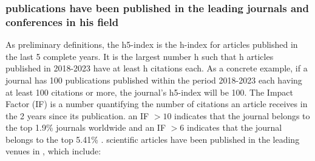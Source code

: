 \documentclass[11pt]{article}
\begin{document}
\subsubsection{\drs publications have been published in the leading journals and conferences in his field}

As preliminary definitions, the h5-index is the h-index for articles published in the last 5 complete years. It is the largest number h such that h articles published in 2018-2023 have at least h citations each. As a concrete example, if a journal has 100 publications published within the period 2018-2023 each having at least 100 citations or more, the journal's h5-index will be 100. The Impact Factor (IF) is a number quantifying the number of citations an article receives in the 2 years since its publication. an IF $> 10$ indicates that the journal belongs to the top 1.9\% journals worldwide and an IF $> 6$ indicates that the journal belongs to the top 5.41\% \cite{impact_factor}. \drs scientific articles have been published in the leading venues in \fie{}, which include:
\end{document}
